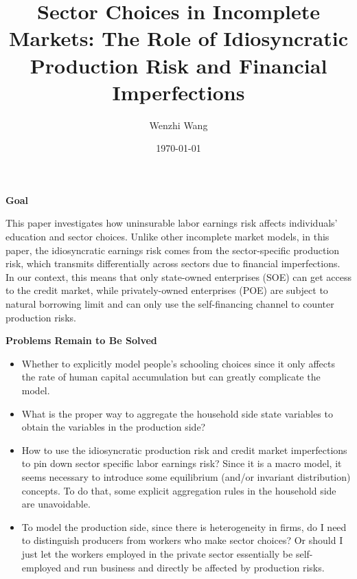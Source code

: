 \documentclass[12pt]{article}
\theoremstyle{definition}
\begin{document}
\title{\bf {Sector Choices in Incomplete Markets: The Role of Idiosyncratic Production Risk and Financial Imperfections}} 
\author{Wenzhi Wang} 
\date{\today}
\maketitle

\begin{spacing}{1}

{\noindent \bf Goal}

This paper investigates how uninsurable labor earnings risk affects individuals' education and sector choices. Unlike other incomplete market models, in this paper, the idiosyncratic earnings risk comes from the sector-specific production risk, which transmits differentially across sectors due to financial imperfections. In our context, this means that only state-owned enterprises (SOE) can get access to the credit market, while privately-owned enterprises (POE) are subject to natural borrowing limit and can only use the self-financing channel to counter production risks.

{\noindent \bf Problems Remain to Be Solved}

\begin{itemize}[leftmargin=15pt, itemsep=0pt, topsep=0pt]
	\item Whether to explicitly model people's schooling choices since it only affects the rate of human capital accumulation but can greatly complicate the model.
	\item What is the proper way to aggregate the household side state variables to obtain the variables in the production side?
	\item How to use the idiosyncratic production risk and credit market imperfections to pin down sector specific labor earnings risk? Since it is a macro model, it seems necessary to introduce some equilibrium (and/or invariant distribution) concepts. To do that, some explicit aggregation rules in the household side are unavoidable.
	\item To model the production side, since there is heterogeneity in firms, do I need to distinguish producers from workers who make sector choices? Or should I just let the workers employed in the private sector essentially be self-employed and run business and directly be affected by production risks.
\end{itemize}


\end{spacing}
\end{document}

